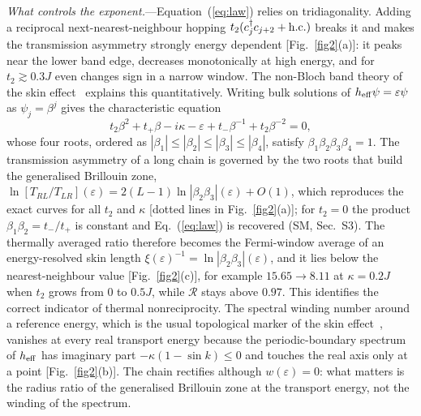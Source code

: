 \documentclass[reprint,aps,prl,superscriptaddress,nofootinbib,floatfix]{revtex4-2}
\newcommand{\R}{\mathcal{R}}
\newcommand{\heff}{h_{\rm eff}}
\begin{document}
\textit{What controls the exponent.}---Equation~(\ref{eq:law}) relies on tridiagonality. Adding a reciprocal next-nearest-neighbour hopping $t_2(c_j^\dagger c_{j+2}+{\rm h.c.})$ breaks it and makes the transmission asymmetry strongly energy dependent [Fig.~\ref{fig2}(a)]: it peaks near the lower band edge, decreases monotonically at high energy, and for $t_2\gtrsim0.3J$ even changes sign in a narrow window.
The non-Bloch band theory of the skin effect~\cite{Yao2018,Yokomizo2019} explains this quantitatively. Writing bulk solutions of $\heff\psi=\varepsilon\psi$ as $\psi_j=\beta^j$ gives the characteristic equation
\begin{equation}
t_2\beta^2+t_+\beta-i\kappa-\varepsilon+t_-\beta^{-1}+t_2\beta^{-2}=0,
\label{eq:nonbloch}
\end{equation}
whose four roots, ordered as $|\beta_1|\le|\beta_2|\le|\beta_3|\le|\beta_4|$, satisfy $\beta_1\beta_2\beta_3\beta_4=1$. The transmission asymmetry of a long chain is governed by the two roots that build the generalised Brillouin zone, $\ln[T_{RL}/T_{LR}](\varepsilon)=2(L-1)\ln|\beta_2\beta_3|(\varepsilon)+O(1)$, which reproduces the exact curves for all $t_2$ and $\kappa$ [dotted lines in Fig.~\ref{fig2}(a)]; for $t_2=0$ the product $\beta_1\beta_2=t_-/t_+$ is constant and Eq.~(\ref{eq:law}) is recovered (SM, Sec.~S3).
The thermally averaged ratio therefore becomes the Fermi-window average of an energy-resolved skin length $\xi(\varepsilon)^{-1}=\ln|\beta_2\beta_3|(\varepsilon)$, and it lies below the nearest-neighbour value [Fig.~\ref{fig2}(c)], for example $15.65\to8.11$ at $\kappa=0.2J$ when $t_2$ grows from $0$ to $0.5J$, while $\R$ stays above $0.97$.
This identifies the correct indicator of thermal nonreciprocity. The spectral winding number around a reference energy, which is the usual topological marker of the skin effect~\cite{Gong2018,Okuma2020,Zhang2020}, vanishes at every real transport energy because the periodic-boundary spectrum of $\heff$ has imaginary part $-\kappa(1-\sin k)\le0$ and touches the real axis only at a point [Fig.~\ref{fig2}(b)].
The chain rectifies although $w(\varepsilon)=0$: what matters is the radius ratio of the generalised Brillouin zone at the transport energy, not the winding of the spectrum.
\end{document}
